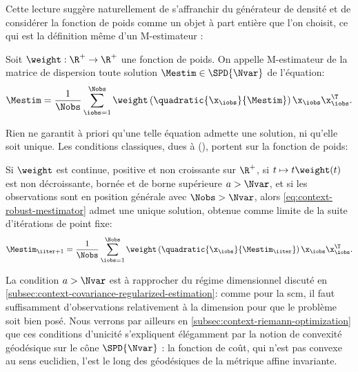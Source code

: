 Cette lecture suggère naturellement de s'affranchir du générateur de densité et de considérer la fonction de poids comme un objet à part entière que l'on choisit, ce qui est la définition même d'un M-estimateur :

\begin{definition}
\label{def:context-robust-mestimator}
  Soit $\weight:\R^+\to\R^+$ une fonction de poids. On appelle M-estimateur de la matrice de dispersion toute solution $\Mestim\in\SPD{\Nvar}$ de l'équation:
\begin{equation}
  \Mestim
  =
  \frac{1}{\Nobs}\sum_{\iobs=1}^{\Nobs}
  \weight\left(\quadratic{\x_\iobs}{\Mestim}\right)
  \x_\iobs\x_\iobs^\T.
  \label{eq:context-robust-mestimator}
\end{equation}
\end{definition}

Rien ne garantit à priori qu'une telle équation admette une solution, ni qu'elle soit unique. Les conditions classiques, dues à (\cite{Maronna76}), portent sur la fonction de poids:

\begin{proposition}
\label{prop:context-robust-existence}
  Si $\weight$ est continue, positive et non croissante sur $\R^+$, si $t\mapsto t\weight(t)$ est non décroissante, bornée et de borne supérieure $a>\Nvar$, et si les observations sont en position générale avec $\Nobs>\Nvar$, alors \cref{eq:context-robust-mestimator} admet une unique solution, obtenue comme limite de la suite d'itérations de point fixe:
\begin{equation}
  \Mestim_{\iiter+1}
  =
  \frac{1}{\Nobs}\sum_{\iobs=1}^{\Nobs}
  \weight\left(\quadratic{\x_\iobs}{\Mestim_\iiter}\right)
  \x_\iobs\x_\iobs^\T.
  \label{eq:context-robust-iterations}
\end{equation}
\end{proposition}

\begin{remark}
  La condition $a>\Nvar$ est à rapprocher du régime dimensionnel discuté en \cref{subsec:context-covariance-regularized-estimation}: comme pour la scm, il faut suffisamment d'observations relativement à la dimension pour que le problème soit bien posé. Nous verrons par ailleurs en \cref{subsec:context-riemann-optimization} que ces conditions d'unicité s'expliquent élégamment par la notion de convexité géodésique sur le cône $\SPD{\Nvar}$ : la fonction de coût, qui n'est pas convexe au sens euclidien, l'est le long des géodésiques de la métrique affine invariante.
\end{remark}

